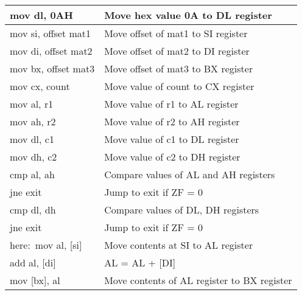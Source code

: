 \documentclass[12pt,a4paper]{article}
\begin{document}
\begin{flushleft}
\begin{table}[htb]
{\begin{tabular}{|l|l|}
\hline
mov dl, 0AH                                                      & Move hex value 0A to DL register              \\
\hline
mov si, offset mat1                                              & Move offset of mat1 to SI register            \\
\hline
mov di, offset mat2                                              & Move offset of mat2 to DI register            \\
\hline
mov bx, offset mat3                                              & Move offset of mat3 to BX register            \\
\hline
mov cx, count                                                    & Move value of count to CX register            \\
\hline
mov al, r1                                                       & Move value of r1 to AL register               \\
\hline
mov ah, r2                                                       & Move value of r2 to AH register               \\
\hline
mov dl, c1                                                       & Move value of c1 to DL register               \\
\hline
mov dh, c2                                                       & Move value of c2 to DH register               \\ 
\hline
cmp al, ah                                                       & Compare values of AL and AH registers         \\
\hline
jne exit                                                         & Jump to exit if ZF = 0                        \\
\hline
cmp dl, dh                                                       & Compare values of DL, DH registers            \\
\hline
jne exit                                                         & Jump to exit if ZF = 0                        \\
\hline
here:~mov al, [si]                                               & Move contents at SI to AL register            \\
\hline            
add al, [di]                                                     & AL = AL + [DI]                                \\
\hline
mov [bx], al                                                     & Move contents of AL register to BX register   \\

\end{tabular}}
\end{table}
\end{flushleft}
\end{document}
